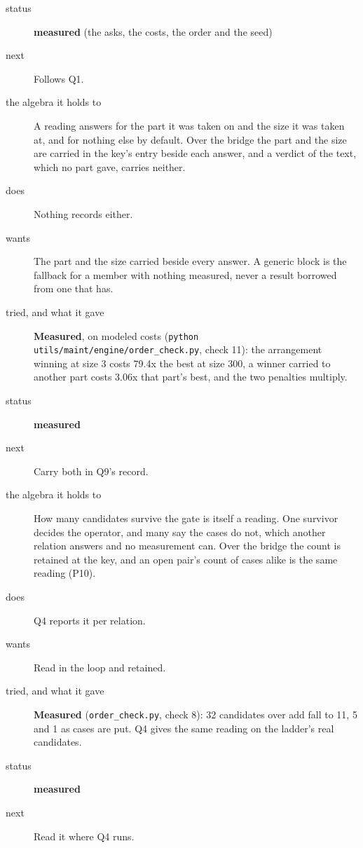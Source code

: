 \begin{description}
\item[{status}] \textbf{measured} (the asks, the costs, the order and the seed)
\item[{next}] Follows Q1.
\end{description}

\begin{description}
\item[{the algebra it holds to}] A reading answers for the part it was taken on and the size it was taken at, and for nothing else by default. Over the bridge the part and the size are carried in the key's entry beside each answer, and a verdict of the text, which no part gave, carries neither.
\item[{does}] Nothing records either.
\item[{wants}] The part and the size carried beside every answer. A generic block is the fallback for a member with nothing measured, never a result borrowed from one that has.
\item[{tried, and what it gave}] \textbf{Measured}, on modeled costs (\texttt{python utils/\allowbreak{}maint/\allowbreak{}engine/\allowbreak{}order\_\allowbreak{}check.\allowbreak{}py}, check 11): the arrangement winning at size 3 costs 79.4x the best at size 300, a winner carried to another part costs 3.06x that part's best, and the two penalties multiply.
\item[{status}] \textbf{measured}
\item[{next}] Carry both in Q9's record.
\end{description}

\begin{description}
\item[{the algebra it holds to}] How many candidates survive the gate is itself a reading. One survivor decides the operator, and many say the cases do not, which another relation answers and no measurement can. Over the bridge the count is retained at the key, and an open pair's count of cases alike is the same reading (P10).
\item[{does}] Q4 reports it per relation.
\item[{wants}] Read in the loop and retained.
\item[{tried, and what it gave}] \textbf{Measured} (\texttt{order\_\allowbreak{}check.\allowbreak{}py}, check 8): 32 candidates over add fall to 11, 5 and 1 as cases are put. Q4 gives the same reading on the ladder's real candidates.
\item[{status}] \textbf{measured}
\item[{next}] Read it where Q4 runs.
\end{description}

